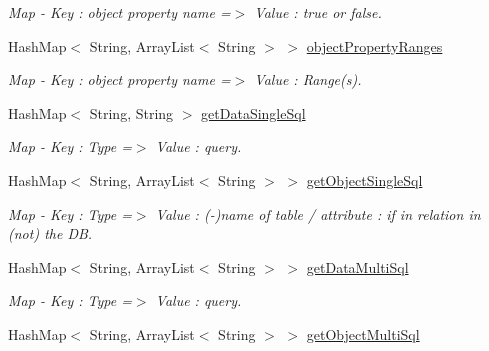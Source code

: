 \begin{DoxyCompactItemize}
\begin{DoxyCompactList}\small\item\em Map -\/ Key : object property name =$>$ Value : true or false. \end{DoxyCompactList}\item 
\hypertarget{class_classes_c_p_p_1_1_dao_generator_af8c39fd61441c9eaa88b350a7890c347}{
HashMap$<$ String, ArrayList$<$ String $>$ $>$ \hyperlink{class_classes_c_p_p_1_1_dao_generator_af8c39fd61441c9eaa88b350a7890c347}{objectPropertyRanges}}
\label{class_classes_c_p_p_1_1_dao_generator_af8c39fd61441c9eaa88b350a7890c347}

\begin{DoxyCompactList}\small\item\em Map -\/ Key : object property name =$>$ Value : Range(s). \end{DoxyCompactList}\item 
\hypertarget{class_classes_c_p_p_1_1_dao_generator_a6be3dbb95bc9ecb7cc20e19ec207f002}{
HashMap$<$ String, String $>$ \hyperlink{class_classes_c_p_p_1_1_dao_generator_a6be3dbb95bc9ecb7cc20e19ec207f002}{getDataSingleSql}}
\label{class_classes_c_p_p_1_1_dao_generator_a6be3dbb95bc9ecb7cc20e19ec207f002}

\begin{DoxyCompactList}\small\item\em Map -\/ Key : Type =$>$ Value : query. \end{DoxyCompactList}\item 
\hypertarget{class_classes_c_p_p_1_1_dao_generator_a76d97a7ffeeaa76262df17e7f24e4fab}{
HashMap$<$ String, ArrayList$<$ String $>$ $>$ \hyperlink{class_classes_c_p_p_1_1_dao_generator_a76d97a7ffeeaa76262df17e7f24e4fab}{getObjectSingleSql}}
\label{class_classes_c_p_p_1_1_dao_generator_a76d97a7ffeeaa76262df17e7f24e4fab}

\begin{DoxyCompactList}\small\item\em Map -\/ Key : Type =$>$ Value : (-\/)name of table / attribute : if in relation in (not) the DB. \end{DoxyCompactList}\item 
\hypertarget{class_classes_c_p_p_1_1_dao_generator_ada1138c2e61e4981aafd2876a852887a}{
HashMap$<$ String, ArrayList$<$ String $>$ $>$ \hyperlink{class_classes_c_p_p_1_1_dao_generator_ada1138c2e61e4981aafd2876a852887a}{getDataMultiSql}}
\label{class_classes_c_p_p_1_1_dao_generator_ada1138c2e61e4981aafd2876a852887a}

\begin{DoxyCompactList}\small\item\em Map -\/ Key : Type =$>$ Value : query. \end{DoxyCompactList}\item 
\hypertarget{class_classes_c_p_p_1_1_dao_generator_a95f95dd4acf39921a18501d22c3130c3}{
HashMap$<$ String, ArrayList$<$ String $>$ $>$ \hyperlink{class_classes_c_p_p_1_1_dao_generator_a95f95dd4acf39921a18501d22c3130c3}{getObjectMultiSql}}
\label{class_classes_c_p_p_1_1_dao_generator_a95f95dd4acf39921a18501d22c3130c3}


\end{DoxyCompactItemize}
